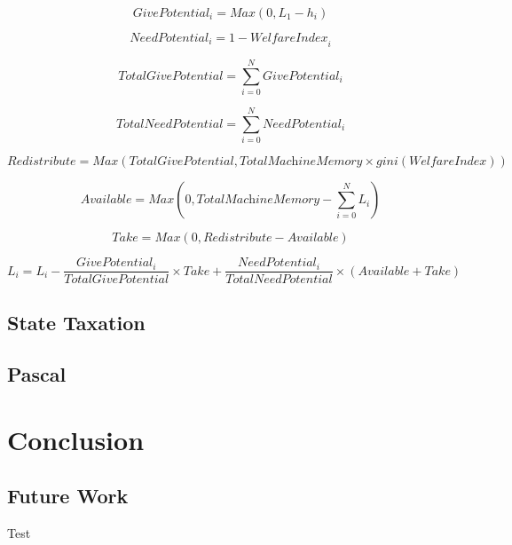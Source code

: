 \documentclass{l4proj}
\begin{document}
\begin{equation}
\textit{GivePotential}_i = Max(0,L_1 - h_i)
\end{equation}

\begin{equation}
\textit{NeedPotential}_i = 1 - \textit{WelfareIndex}_i
\end{equation}

\begin{equation}
\textit{TotalGivePotential} = \sum_{i=0}^{N}\textit{GivePotential}_i
\end{equation}

\begin{equation}
\textit{TotalNeedPotential} = \sum_{i=0}^{N}\textit{NeedPotential}_i
\end{equation}

\begin{equation}
\textit{Redistribute} = Max(TotalGivePotential,\textit{TotalMachineMemory} \times \textit{gini}(\textit{WelfareIndex}))
\end{equation}

\begin{equation}
\textit{Available} = Max(0,\textit{TotalMachineMemory} - \sum_{i=0}^{N}L_i)
\end{equation}

\begin{equation}
\textit{Take} = Max(0,\textit{Redistribute} - \textit{Available})
\end{equation}

\begin{equation}
L_i = L_i - \frac{\textit{GivePotential}_i}{\textit{TotalGivePotential}} \times Take + \frac{\textit{NeedPotential}_i}{\textit{TotalNeedPotential}}\times (Available + Take) 
\end{equation}

\section{State Taxation}
\section{Pascal}
\chapter{Conclusion}
\section{Future Work}
Test
\end{document}
